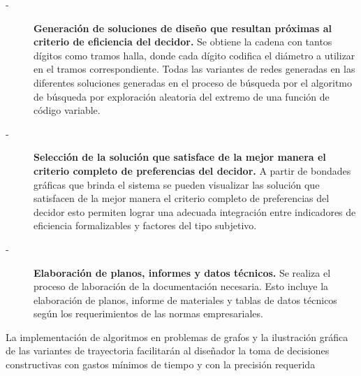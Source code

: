 \begin{description}
    \item[-]\textbf{Generación de soluciones de diseño que resultan próximas al criterio de eficiencia del decidor.} Se obtiene la cadena con tantos dígitos como tramos halla, donde cada dígito codifica el diámetro a utilizar en el tramos correspondiente. Todas las variantes de redes generadas en las diferentes soluciones generadas en el proceso de búsqueda por el algoritmo de búsqueda por exploración aleatoria del extremo de una función de código variable.
    \item[-]\textbf{Selección de la solución que satisface de la mejor manera el criterio completo de preferencias del decidor.} A partir de bondades gráficas que brinda el sistema se pueden visualizar las solución que satisfacen de la mejor manera el criterio completo de preferencias del decidor esto permiten lograr una adecuada integración entre indicadores de eficiencia formalizables y factores del tipo subjetivo.
    \item[-]\textbf{Elaboración de planos, informes y datos técnicos.} Se realiza el proceso de laboración de la documentación necesaria. Esto incluye la elaboración de planos, informe de materiales y tablas de datos técnicos según los requerimientos de las normas empresariales.
\end{description}
\noindent La implementación de algoritmos en problemas de grafos y la ilustración gráfica de las variantes de trayectoria facilitarán al diseñador la toma de decisiones constructivas con gastos mínimos de tiempo y con la precisión requerida

\newpage